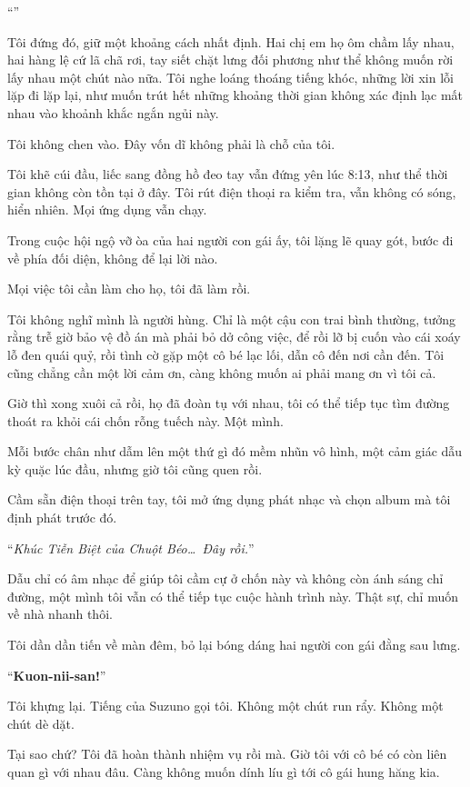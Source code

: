 \documentclass[../main.tex]{subfiles}
\begin{document}

``''

Tôi đứng đó, giữ một khoảng cách nhất định. Hai chị em họ ôm chầm lấy nhau, hai hàng lệ cứ lã chã rơi, tay siết chặt lưng đối phương như thể không muốn rời lấy nhau một chút nào nữa. Tôi nghe loáng thoáng tiếng khóc, những lời xin lỗi lặp đi lặp lại, như muốn trút hết những khoảng thời gian không xác định lạc mất nhau vào khoảnh khắc ngắn ngủi này.

Tôi không chen vào. Đây vốn dĩ không phải là chỗ của tôi.

Tôi khẽ cúi đầu, liếc sang đồng hồ đeo tay vẫn đứng yên lúc 8:13, như thể thời gian không còn tồn tại ở đây. Tôi rút điện thoại ra kiểm tra, vẫn không có sóng, hiển nhiên. Mọi ứng dụng vẫn chạy.

Trong cuộc hội ngộ vỡ òa của hai người con gái ấy, tôi lặng lẽ quay gót, bước đi về phía đối diện, không để lại lời nào.

Mọi việc tôi cần làm cho họ, tôi đã làm rồi.

Tôi không nghĩ mình là người hùng. Chỉ là một cậu con trai bình thường, tưởng rằng trễ giờ bảo vệ đồ án mà phải bỏ dở công việc, để rồi lỡ bị cuốn vào cái xoáy lỗ đen quái quỷ, rồi tình cờ gặp một cô bé lạc lối, dẫn cô đến nơi cần đến. Tôi cũng chẳng cần một lời cảm ơn, càng không muốn ai phải mang ơn vì tôi cả.

Giờ thì xong xuôi cả rồi, họ đã đoàn tụ với nhau, tôi có thể tiếp tục tìm đường thoát ra khỏi cái chốn rỗng tuếch này. Một mình.

Mỗi bước chân như dẫm lên một thứ gì đó mềm nhũn vô hình, một cảm giác dẫu kỳ quặc lúc đầu, nhưng giờ tôi cũng quen rồi.

Cầm sẵn điện thoại trên tay, tôi mở ứng dụng phát nhạc và chọn album mà tôi định phát trước đó.

``\textit{Khúc Tiễn Biệt của Chuột Béo\dots\ Đây rồi.}''

Dẫu chỉ có âm nhạc để giúp tôi cầm cự ở chốn này và không còn ánh sáng chỉ đường, một mình tôi vẫn có thể tiếp tục cuộc hành trình này. Thật sự, chỉ muốn về nhà nhanh thôi.

Tôi dần dần tiến về màn đêm, bỏ lại bóng dáng hai người con gái đằng sau lưng.

``\textbf{Kuon-nii-san!}''

Tôi khựng lại. Tiếng của Suzuno gọi tôi. Không một chút run rẩy. Không một chút dè dặt.

Tại sao chứ? Tôi đã hoàn thành nhiệm vụ rồi mà. Giờ tôi với cô bé có còn liên quan gì với nhau đâu. Càng không muốn dính líu gì tới cô gái hung hăng kia.
\end{document}
